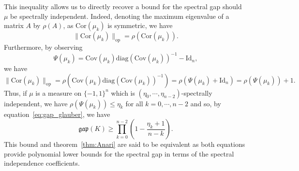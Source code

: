 This inequality allows us to directly recover a bound for the spectral gap should \(\mu\) be spectrally 
independent. Indeed, denoting the maximum eigenvalue of a matrix \(A\) by \(\rho(A)\), as \(\text{Cor}(\mu_k)\) is symmetric, we 
have 
\[\|\text{Cor}(\mu_k)\|_{\text{op}} = \rho(\text{Cor}(\mu_k)).\] 
Furthermore, by observing 
\[\Psi(\mu_k) = \text{Cov}(\mu_k) \text{diag}(\text{Cov}(\mu_k))^{-1} - \text{Id}_n,\] 
we have 
\[\|\text{Cor}(\mu_k)\|_{\text{op}} = \rho(\text{Cov}(\mu_k) \text{diag}(\text{Cov}(\mu_k))^{-1})
  = \rho(\Psi(\mu_k) + \text{Id}_n) = \rho(\Psi(\mu_k)) + 1.\]
Thus, if \(\mu\) is a measure on \(\{-1, 1\}^n\) which is \((\eta_0, \cdots, \eta_{n - 2})\)-spectrally 
independent, we have \(\rho(\Psi(\mu_k)) \le \eta_k\) for all \(k = 0, \cdots, n - 2\) and so, by 
equation~\eqref{eq:gap_glauber}, we have
\begin{equation}\label{eq:gap_glauber_final}
  \mathfrak{gap}(K) \ge \prod_{k = 0}^{n - 2}\left(1 - \frac{\eta_k + 1}{n - k}\right).
\end{equation}
This bound and theorem~\ref{thm:Anari} are said to be equivalent as both equations provide polynomial 
lower bounds for the spectral gap in terms of the spectral independence coefficients.







